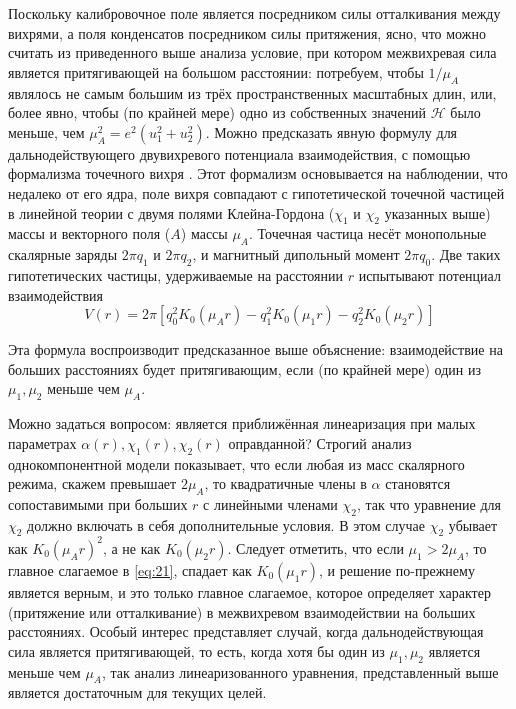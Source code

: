 Поскольку калибровочное поле является посредником силы отталкивания между 
вихрями, а поля конденсатов посредником силы притяжения, ясно, что можно 
считать из приведенного выше анализа условие, при котором межвихревая сила 
является притягивающей на большом расстоянии: потребуем, чтобы \( 1/\mu_A \) 
являлось не самым большим из трёх пространственных масштабных длин, или, 
более явно, чтобы (по крайней мере) одно из собственных значений 
\( \mathcal{H} \) было меньше, чем \( \mu_A^2 = e^2(u_1^2 + u_2^2) \). 
Можно предсказать явную формулу для дальнодействующего двувихревого 
потенциала взаимодействия, с помощью формализма точечного вихря \cite{bib:19}. 
Этот формализм основывается на наблюдении, что недалеко от его ядра, поле 
вихря совпадают с гипотетической точечной частицей в линейной теории с двумя 
полями Клейна-Гордона (\( \chi_1 \) и \( \chi_2 \) указанных выше) массы и 
векторного поля (\( A \)) массы \( \mu_A \). Точечная частица несёт 
монопольные скалярные заряды \( 2\pi q_1 \) и \( 2\pi q_2 \), и магнитный 
дипольный момент \( 2\pi q_0 \). Две таких гипотетических частицы, 
удерживаемые на расстоянии \( r \) испытывают потенциал взаимодействия
\begin{equation}
    V(r) = 2\pi\left[ q_0^2 K_0(\mu_A r) - q_1^2 K_0(\mu_1 r) - 
        q_2^2 K_0(\mu_2 r) \right]
    \label{eq:22}
\end{equation}

Эта формула воспроизводит предсказанное выше объяснение: взаимодействие на 
больших расстояниях будет притягивающим, если (по крайней мере) один из 
\( \mu_1, \mu_2 \) меньше чем \( \mu_A \). 

Можно задаться вопросом: является приближённая линеаризация при малых 
параметрах \( \alpha(r), \chi_1(r), \chi_2(r) \) оправданной? Строгий анализ 
однокомпонентной модели \cite{bib:20} показывает, что если любая из масс 
скалярного режима, скажем превышает \( 2\mu_A \), то квадратичные члены в 
\( \alpha \) становятся сопоставимыми при больших \( r \) с линейными членами 
\( \chi_2 \), так что уравнение для \( \chi_2 \) должно включать в себя 
дополнительные условия. В этом случае \( \chi_2 \) убывает как 
\( K_0(\mu_A r)^2 \), а не как \( K_0(\mu_2 r) \). Следует отметить, что если 
\( \mu_1 > 2\mu_A \), то главное слагаемое в \eqref{eq:21}, спадает как 
\( K_0(\mu_1 r) \), и решение по-прежнему является верным, и это только 
главное слагаемое, которое определяет характер (притяжение или отталкивание) в 
межвихревом взаимодействии на больших расстояниях. Особый интерес представляет 
случай, когда дальнодействующая сила является притягивающей, то есть, когда 
хотя бы один из \( \mu_1, \mu_2 \) является меньше чем \( \mu_A \), так 
анализ линеаризованного уравнения, представленный выше является достаточным 
для текущих целей. \cite{bib:main}

